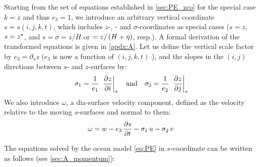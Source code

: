 \documentclass[../main/NEMO_manual]{subfiles}
\begin{document}
Starting from the set of equations established in \autoref{sec:PE_zco} for the special case $k = z$ and
thus $e_3 = 1$, we introduce an arbitrary vertical coordinate $s = s(i,j,k,t)$,
which includes $z$-, \zstar- and $\sigma$-coordinates as special cases
($s = z$, $s = \zstar$, and $s = \sigma = z / H$ or $ = z / \lt( H + \eta \rt)$, resp.).
A formal derivation of the transformed equations is given in \autoref{apdx:A}.
Let us define the vertical scale factor by $e_3 = \partial_s z$  ($e_3$ is now a function of $(i,j,k,t)$ ),
and the slopes in the $(i,j)$ directions between $s$- and $z$-surfaces by:
\begin{equation}
  \label{eq:PE_sco_slope}
  \sigma_1 = \frac{1}{e_1} \; \lt. \pd[z]{i} \rt|_s \quad \text{and} \quad
  \sigma_2 = \frac{1}{e_2} \; \lt. \pd[z]{j} \rt|_s
\end{equation}
We also introduce $\omega$, a dia-surface velocity component, defined as the velocity 
relative to the moving $s$-surfaces and normal to them:
\[
  \omega = w - e_3 \, \pd[s]{t} - \sigma_1 \, u - \sigma_2 \, v
\]

The equations solved by the ocean model \autoref{eq:PE} in $s$-coordinate can be written as follows
(see \autoref{sec:A_momentum}):
\end{document}
